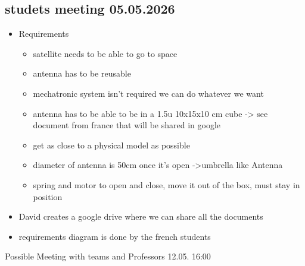 	\subsection{studets meeting 05.05.2026}
	\begin{itemize}
		\item Requirements
		\begin{itemize}
			\item satellite needs to be able to go to space
			\item 	antenna has to be reusable 
			\item	mechatronic system isn't required we can do whatever we want
			\item antenna has to be able to be in a 1.5u 10x15x10 cm cube -> see document from france that will be shared in google
			\item get as close to a physical model as possible
			\item diameter of antenna is 50cm once it's open ->umbrella like Antenna
			\item spring and motor to open and close, move it out of the box, must stay in position 
		\end{itemize}
		\item David creates a google drive where we can share all the documents
		\item	requirements diagram is done by the french students
	\end{itemize}
	
	Possible Meeting with teams and Professors 12.05. 16:00
